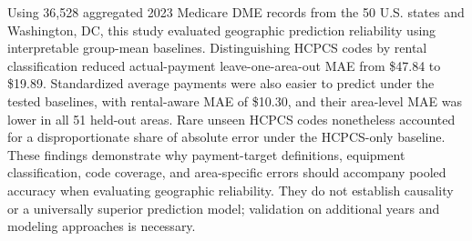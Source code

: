 Using 36,528 aggregated 2023 Medicare DME records from the 50 U.S. states and Washington, DC, this study evaluated geographic prediction reliability using interpretable group-mean baselines. Distinguishing HCPCS codes by rental classification reduced actual-payment leave-one-area-out MAE from \$47.84 to \$19.89. Standardized average payments were also easier to predict under the tested baselines, with rental-aware MAE of \$10.30, and their area-level MAE was lower in all 51 held-out areas. Rare unseen HCPCS codes nonetheless accounted for a disproportionate share of absolute error under the HCPCS-only baseline. These findings demonstrate why payment-target definitions, equipment classification, code coverage, and area-specific errors should accompany pooled accuracy when evaluating geographic reliability. They do not establish causality or a universally superior prediction model; validation on additional years and modeling approaches is necessary.
